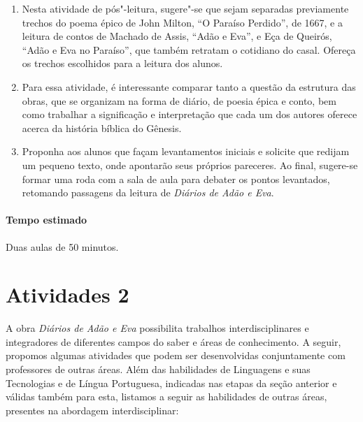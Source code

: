 \documentclass[12pt]{extarticle}
\begin{document}
\begin{enumerate}
\item
Nesta atividade de pós"-leitura, sugere"-se que sejam separadas previamente
trechos do poema épico de John Milton, ``O Paraíso Perdido'', de 1667, e a leitura de contos de 
Machado de Assis, ``Adão e Eva'', e Eça de Queirós, ``Adão e Eva no Paraíso'', que também retratam o cotidiano 
do casal. Ofereça os trechos escolhidos para a leitura dos alunos. 

\item
Para essa atividade, é interessante comparar tanto a questão
da estrutura das obras, que se organizam na forma de diário, de poesia
épica e conto, bem como trabalhar a significação e interpretação que cada um dos
autores oferece acerca da história bíblica do Gênesis. 

\item
Proponha aos alunos que façam levantamentos iniciais e solicite que redijam um pequeno texto,
onde apontarão seus próprios pareceres. Ao final, sugere-se formar uma
roda com a sala de aula para debater os pontos levantados, retomando passagens da leitura de \emph{Diários de Adão e Eva}.

\end{enumerate}


\paragraph{Tempo estimado} Duas aulas de 50 minutos. 

\section{Atividades 2}


A obra \emph{Diários de Adão e Eva} possibilita trabalhos
interdisciplinares e integradores de diferentes campos do saber e áreas
de conhecimento. A seguir, propomos algumas atividades que podem ser
desenvolvidas conjuntamente com professores de outras áreas. Além das
habilidades de Linguagens e suas Tecnologias e de Língua Portuguesa,
indicadas nas etapas da seção anterior e válidas também para esta,
listamos a seguir as habilidades de outras áreas, presentes na abordagem
interdisciplinar:
\end{document}
